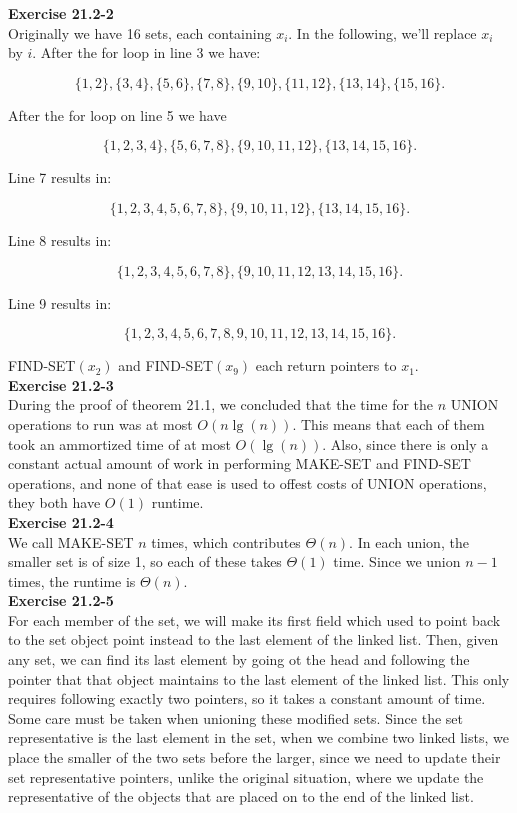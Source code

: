 \documentclass{article}
\begin{document}
\noindent\textbf{Exercise 21.2-2}\\

Originally we have 16 sets, each containing $x_i$.  In the following, we'll replace $x_i$ by $i$.  After the for loop in line 3 we have:

\[ \{1,2\}, \{3,4\}, \{5,6\}, \{7,8\}, \{9,10\}, \{11,12\}, \{13,14\}, \{15,16\}.\]

After the for loop on line 5 we have

\[ \{1,2,3,4\}, \{5,6,7,8\}, \{9,10,11,12\}, \{13,14,15,16\}.\]

Line 7 results in:

\[ \{1,2,3,4,5,6,7,8\}, \{9,10,11,12\}, \{13,14,15,16\}.\]

Line 8 results in:

\[ \{1,2,3,4,5,6,7,8\}, \{9,10,11,12,13,14,15,16\}.\]

Line 9 results in:

\[ \{1,2,3,4,5,6,7,8,9,10,11,12,13,14,15,16\}.\]

FIND-SET$(x_2)$ and FIND-SET$(x_9)$ each return pointers to $x_1$. \\

\noindent\textbf{Exercise 21.2-3}\\

During the proof of theorem 21.1, we concluded that the time for the $n$ UNION operations to run was at most $O(n\lg(n))$. This means that each of them took an ammortized time of at most $O(\lg(n))$. Also, since there is only a constant actual amount of work in performing MAKE-SET and FIND-SET operations, and none of that ease is used to offest costs of UNION operations, they both have $O(1)$ runtime.\\

\noindent\textbf{Exercise 21.2-4}\\

We call MAKE-SET $n$ times, which contributes $\Theta(n)$.  In each union, the smaller set is of size 1, so each of these takes $\Theta(1)$ time.  Since we union $n-1$ times, the runtime is $\Theta(n)$. \\

\noindent\textbf{Exercise 21.2-5}\\

For each member of the set, we will make its first field which used to point back to the set object point instead to the last element of the linked list. Then, given any set, we can find its last element by going ot the head and following the pointer that that object maintains to the last element of the linked list. This only requires following exactly two pointers, so it takes a constant amount of time. Some care must be taken when unioning these modified sets. Since the set representative is the last element in the set, when we combine two linked lists, we place the smaller of the two sets before the larger, since we need to update their set representative pointers, unlike the original situation, where we update the representative of the objects that are placed on to the end of the linked list.\\
\end{document}
